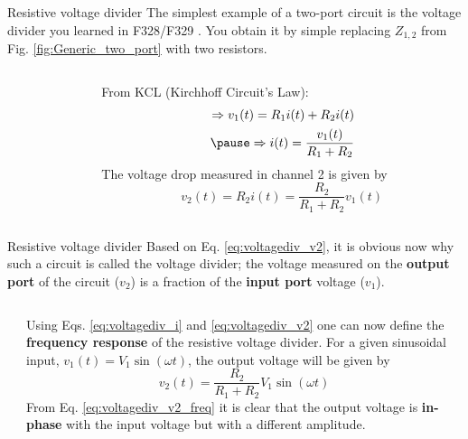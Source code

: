 \begin{frame}{Resistive voltage divider}
The simplest example of a two-port circuit is the voltage divider you learned in F328/F329 \cite{Walker:2008aa}. You obtain it by simple replacing $Z_{1,2}$ from Fig. \ref{fig:Generic_two_port} with two resistors.
\vspace{10pt}
\begin{columns}
	\begin{column}{0.5\textwidth}
	\end{column}
	\begin{column}{0.5\textwidth}
	\pause
	From KCL (Kirchhoff Circuit's Law):
		\begin{eqnarray}
		\Rightarrow v_1(t)=R_1 i(t)+ R_2 i(t)\\
		\pause
		\Rightarrow i(t)=\frac{v_1(t)}{R_1+R_2}
		\label{eq:voltagediv_i}
  		\end{eqnarray}
	The voltage drop measured in channel 2 is given by
	\begin{equation}
  		v_2(t)=R_2 i(t)=\frac{R_2}{R_1+R_2}v_1(t)
  		\label{eq:voltagediv_v2}
	\end{equation}
	
	\end{column}
\end{columns}
\end{frame}

\begin{frame}{Resistive voltage divider}
Based on Eq. \ref{eq:voltagediv_v2}, it is obvious now why such a circuit is called the voltage divider; the voltage measured on the \textbf{output port} of the circuit ($v_2$) is a fraction of the \textbf{input port} voltage ($v_1$).
	\begin{columns}
		\begin{column}{0.4\textwidth}
		\end{column}
		\begin{column}{0.6\textwidth}
		Using Eqs. \ref{eq:voltagediv_i} and \ref{eq:voltagediv_v2} one can now define the \textbf{frequency response} of the resistive voltage divider. For a given sinusoidal input, $v_1(t)=V_1\sin(\omega t)$, the output voltage will be given by 
\begin{equation}
  v_2(t)=\frac{R_2}{R_1+R_2}V_1\sin(\omega t)
  \label{eq:voltagediv_v2_freq}
\end{equation}
From Eq. \ref{eq:voltagediv_v2_freq} it is clear that the output voltage is \textbf{in-phase} with the input voltage but with a different amplitude.

		\end{column}
	\end{columns}
\end{frame}


